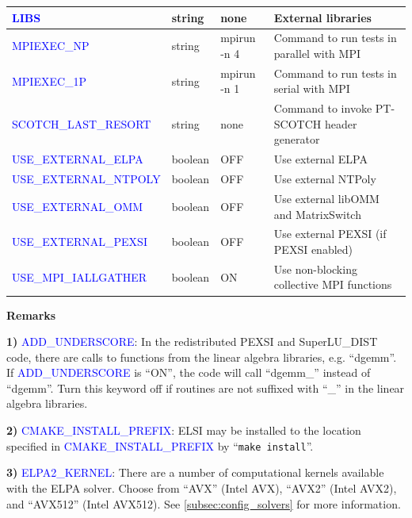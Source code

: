 \documentclass{report}
\newcommand{\tcb}[1]{\textcolor{blue}{#1}}
\begin{document}
\begin{tabular}[]{|p{50mm}|p{15mm}|p{20mm}|p{80mm}|}
\hline
\tcb{LIBS}                     & string  & none        & External libraries\\
\hline
\tcb{MPIEXEC\_NP}              & string  & mpirun -n 4 & Command to run tests in parallel with MPI\\
\hline
\tcb{MPIEXEC\_1P}              & string  & mpirun -n 1 & Command to run tests in serial with MPI\\
\hline
\tcb{SCOTCH\_LAST\_RESORT}     & string  & none        & Command to invoke PT-SCOTCH header generator\\
\hline
\tcb{USE\_EXTERNAL\_ELPA}      & boolean & OFF         & Use external ELPA\\
\hline
\tcb{USE\_EXTERNAL\_NTPOLY}    & boolean & OFF         & Use external NTPoly\\
\hline
\tcb{USE\_EXTERNAL\_OMM}       & boolean & OFF         & Use external libOMM and MatrixSwitch\\
\hline
\tcb{USE\_EXTERNAL\_PEXSI}     & boolean & OFF         & Use external PEXSI (if PEXSI enabled)\\
\hline
\tcb{USE\_MPI\_IALLGATHER}     & boolean & ON          & Use non-blocking collective MPI functions\\
\hline
\end{tabular}

\textbf{Remarks}

\textbf{1)} \tcb{ADD\_UNDERSCORE}: In the redistributed PEXSI and SuperLU\_DIST code, there are calls to functions from the linear algebra libraries, e.g. ``dgemm''. If \tcb{ADD\_UNDERSCORE} is ``ON'', the code will call ``dgemm\_'' instead of ``dgemm''. Turn this keyword off if routines are not suffixed with ``\_'' in the linear algebra libraries.

\textbf{2)} \tcb{CMAKE\_INSTALL\_PREFIX}: ELSI may be installed to the location specified in \tcb{CMAKE\_INSTALL\_PREFIX} by ``\verb+make install+''.

\textbf{3)} \tcb{ELPA2\_KERNEL}: There are a number of computational kernels available with the ELPA solver. Choose from ``AVX'' (Intel AVX), ``AVX2'' (Intel AVX2), and ``AVX512'' (Intel AVX512). See \ref{subsec:config_solvers} for more information.
\end{document}
